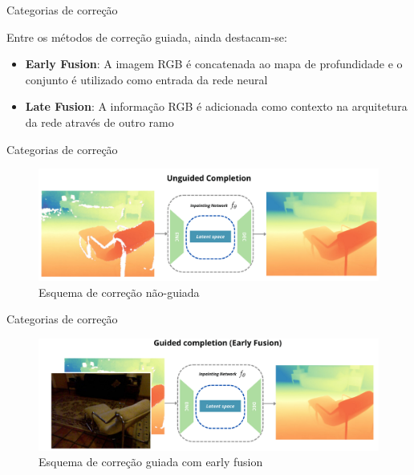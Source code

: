 \documentclass[aspectratio=169]{beamer}
\begin{document}
\begin{frame}{Categorias de correção}

Entre os métodos de correção guiada, ainda destacam-se:

\begin{itemize}
    \item \textbf{Early Fusion}: A imagem RGB é concatenada ao mapa de profundidade e o conjunto é utilizado como entrada da rede neural
    \item \textbf{Late Fusion}: A informação RGB é adicionada como contexto na arquitetura da rede através de outro ramo
\end{itemize}
    
\end{frame}

\begin{frame}{Categorias de correção}

\begin{figure}
    \centering
    \includegraphics[width=\textwidth]{figs/unguided1.png}
    \caption{Esquema de correção não-guiada}
    
\end{figure}
    
\end{frame}

\begin{frame}{Categorias de correção}

\begin{figure}
    \centering
    \includegraphics[width=\textwidth]{figs/earlyfusion1.png}
    \caption{Esquema de correção guiada com early fusion}
    
\end{figure}
    
\end{frame}
\end{document}
